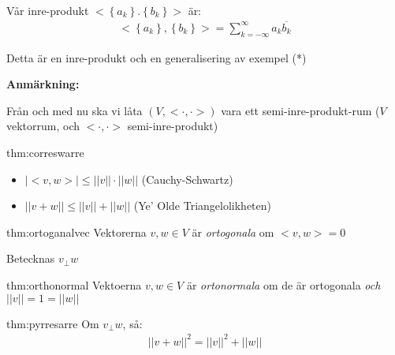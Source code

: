 \noindent Vår inre-produkt $<\left\{a_k\right\}.\left\{b_k\right\}>$ är:
\begin{equation*}
  \begin{gathered}
  <\left\{a_k\right\}, \left\{b_k\right\}> = \sum_{k=-\infty}^{\infty}a_k\overline{b_k}
  \end{gathered}
\end{equation*}\par
\noindent Detta är en inre-produkt och en generalisering av exempel (*)
\par\bigskip
\noindent\textbf{Anmärkning:}\par
\noindent Från och med nu ska vi låta $(V,<\cdot,\cdot>)$  vara ett semi-inre-produkt-rum ($V$ vektorrum, och $<\cdot,\cdot>$ semi-inre-produkt)
\par\bigskip
\begin{theo}{thm:correswarre}
  \begin{itemize}
    \item $\left|<v,w>\right|\leq \left|\left|v\right|\right|\cdot\left|\left|w\right|\right|$ (Cauchy-Schwartz)
    \item $\left|\left|v+w\right|\right| \leq \left|\left|v\right|\right|+\left|\left|w\right|\right|$ (Ye' Olde Triangelolikheten)
  \end{itemize}
\end{theo}
\par\bigskip
\begin{theo}{thm:ortoganalvec}
  Vektorerna $v,w\in V$ är \textit{ortogonala} om $<v,w> = 0$\par
  \noindent Betecknas $v_{\perp}w$
\end{theo}
\par\bigskip
\begin{theo}{thm:orthonormal}
  Vektoerna $v,w\in V$ är \textit{ortonormala} om de är ortogonala \textit{och} $\left|\left|v\right|\right| = 1 = \left|\left|w\right|\right|$
\end{theo}
\par\bigskip
\begin{theo}{thm:pyrresarre}
  Om $v_{\perp}w$, så:
  \begin{equation*}
    \begin{gathered}
      \left|\left|v+w\right|\right|^2 = \left|\left|v\right|\right|^2+\left|\left|w\right|\right|
    \end{gathered}
  \end{equation*}
\end{theo}
